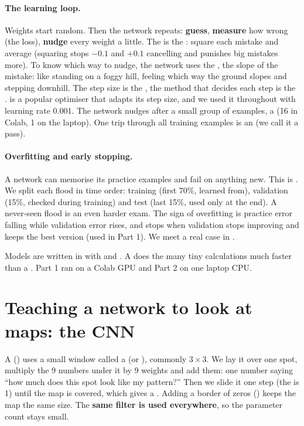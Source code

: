 \paragraph{The learning loop.} Weights start random. Then the network repeats: \textbf{guess}, \textbf{measure} how wrong (the loss), \textbf{nudge} every weight a little. The  is the : square each mistake and average (squaring stops $-0.1$ and $+0.1$ cancelling and punishes big mistakes more). To know which way to nudge, the network uses the , the slope of the mistake: like standing on a foggy hill, feeling which way the ground slopes and stepping downhill. The step size is the , the method that decides each step is the .  is a popular optimiser that adapts its step size, and we used it throughout with learning rate 0.001. The network nudges after a small group of examples, a  (16 in Colab, 1 on the laptop). One trip through all training examples is an  (we call it a pass).

\paragraph{Overfitting and early stopping.} A network can memorise its practice examples and fail on anything new. This is . We split each flood in time order: training (first 70\%, learned from), validation (15\%, checked during training) and test (last 15\%, used only at the end). A never-seen flood is an even harder exam. The sign of overfitting is practice error falling while validation error rises, and  stops when validation stops improving and keeps the best version (used in Part 1). We meet a real case in .

Models are written in  with  and . A  does the many tiny calculations much faster than a . Part 1 ran on a Colab GPU and Part 2 on one laptop CPU.

\section{Teaching a network to look at maps: the CNN}\label{ch:cnn}

A  () uses a small window called a  (or ), commonly $3\times3$. We lay it over one spot, multiply the 9 numbers under it by 9 weights and add them: one number saying ``how much does this spot look like my pattern?'' Then we slide it one step (the  is 1) until the map is covered, which gives a . Adding a border of zeros () keeps the map the same size. The \textbf{same filter is used everywhere}, so the parameter count stays small.

